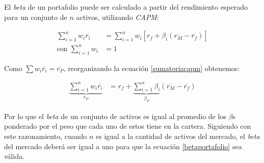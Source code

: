 El \textit{beta} de un portafolio puede ser calculado a partir del rendimiento esperado para un conjunto de $n$ activos, utilizando \textit{CAPM}:

\begin{align}
	\sum\limits_{i=1}^n w_i \overline{r_i} &= \sum\limits_{i=1}^n w_i \left[ r_f + 
		\beta_i (\overline{r_M} - \overline{r_f}) \right] \label{sumatoriacapm} \\
	\mbox{con } \sum\limits_{i=1}^n w_i &= 1 \nonumber
\end{align}

Como $\sum w_i \overline{r_i} = \overline{r_P}$, reorganizando la ecuación \eqref{sumatoriacapm} obtenemos:


\begin{align}
	\underbrace{\sum\limits_{i=1}^n w_i \overline{r_i}}_{r_P} &= r_f + 
		\underbrace{\sum\limits_{i=1}^n \beta_i}_{\beta_P} (\overline{r_M} - \overline{r_f}) \label{betaportafolio}
\end{align}


Por lo que el \textit{beta} de un conjunto de activos es igual al promedio de los $\beta$s ponderado por el peso que cada uno de estos tiene en la cartera. Siguiendo con este razonamiento, cuando $n$ es igual a la cantidad de activos del mercado, el \textit{beta} del mercado deberá ser igual a uno para que la ecuación \eqref{betaportafolio} sea válida.
















